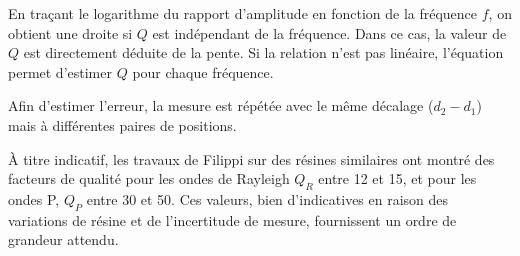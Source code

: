 En traçant le logarithme du rapport d'amplitude en fonction de la fréquence $f$, on obtient une droite si $Q$ est indépendant de la fréquence. Dans ce cas, la valeur de $Q$ est directement déduite de la pente. Si la relation n'est pas linéaire, l'équation permet d'estimer $Q$ pour chaque fréquence.

Afin d'estimer l'erreur, la mesure est répétée avec le même décalage ($d_2-d_1$) mais à différentes paires de positions.

À titre indicatif, les travaux de Filippi \cite{Filippi} sur des résines similaires ont montré des facteurs de qualité pour les ondes de Rayleigh $Q_R$ entre 12 et 15, et pour les ondes P, $Q_P$ entre 30 et 50. Ces valeurs, bien d'indicatives en raison des variations de résine et de l'incertitude de mesure, fournissent un ordre de grandeur attendu.